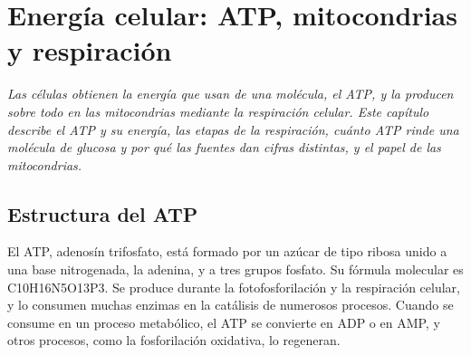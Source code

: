 \documentclass{book}
\begin{document}
\chapter{Energía celular: ATP, mitocondrias y respiración}
\label{chap:bio-03}

\noindent\textit{Las células obtienen la energía que usan de una molécula, el ATP, y la producen sobre todo en las mitocondrias mediante la respiración celular. Este capítulo describe el ATP y su energía, las etapas de la respiración, cuánto ATP rinde una molécula de glucosa y por qué las fuentes dan cifras distintas, y el papel de las mitocondrias.}


\section{Estructura del ATP}

El ATP, adenosín trifosfato, está formado por un azúcar de tipo ribosa unido a una base nitrogenada, la adenina, y a tres grupos fosfato. Su fórmula molecular es C10H16N5O13P3. Se produce durante la fotofosforilación y la respiración celular, y lo consumen muchas enzimas en la catálisis de numerosos procesos. Cuando se consume en un proceso metabólico, el ATP se convierte en ADP o en AMP, y otros procesos, como la fosforilación oxidativa, lo regeneran.

\end{document}
